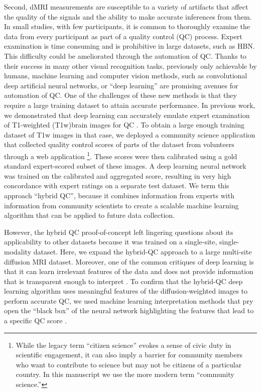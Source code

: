 \documentclass[fleqn,10pt]{wlscirep}
\begin{document}
Second, dMRI measurements are susceptible to a variety of artifacts that affect
the quality of the signals and the ability to make accurate inferences from
them. In small studies, with few participants, it is common to thoroughly
examine the data from every participant as part of a quality control (QC)
process. Expert examination is time consuming and is prohibitive in large
datasets, such as HBN. This difficulty could be ameliorated through the
automation of QC. Thanks to their success in many other visual recognition
tasks, previously only achievable by humans, machine learning and computer
vision methods, such as convolutional deep artificial neural networks, or ``deep
learning'' \cite{lecun2015deep} are promising avenues for automation of QC. One
of the challenges of these new methods is that they require a large training
dataset to attain accurate performance. In previous work, we demonstrated that
deep learning can accurately emulate expert examination of T1-weighted
(T1w)brain images for QC \cite{keshavan2019-er}. To obtain a large enough
training dataset of T1w images in that case, we deployed a community science
application that collected quality control scores of parts of the dataset from
volunteers through a web application \footnote{%
    While the legacy term ``citizen science'' evokes a sense of civic duty in
    scientific engagement, it can also imply a barrier for community members who
    want to contribute to science but may not be citizens of a particular
    country. In this manuscript we use the more modern term ``community
    science.''
}.
These scores were then calibrated using a gold standard expert-scored subset of
these images. A deep learning neural network was trained on the calibrated and
aggregated score, resulting in very high concordance with expert ratings on a
separate test dataset. We term this approach ``hybrid QC'', because it combines
information from experts with information from community scientists to create a
scalable machine learning algorithm that can be applied to future data
collection.

However, the hybrid QC proof-of-concept left lingering questions about its
applicability to other datasets because it was trained on a single-site,
single-modality dataset. Here, we expand the hybrid-QC approach to a large
multi-site diffusion MRI dataset. Moreover, one of the common critiques of deep
learning is that it can learn irrelevant features of the data and does not
provide information that is transparent enough to interpret
\cite{lipton2017doctor, salahuddin2022transparency, Zech2018-ki}. To confirm
that the hybrid-QC deep learning algorithm uses meaningful features of the
diffusion-weighted images to perform accurate QC, we used machine learning
interpretation methods that pry open the ``black box'' of the neural network
highlighting the features that lead to a specific QC score
\cite{sundararajan2017axiomatic,murdoch2019definitions}.
\end{document}
